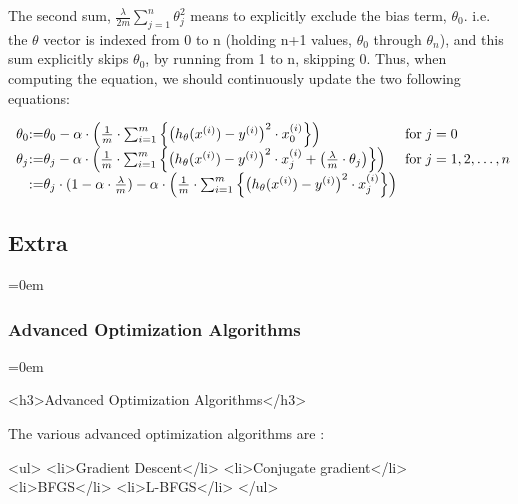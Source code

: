The second sum, 
\( \frac{\lambda}{2m}
   \sum_{j = 1}^{n} {\theta_{j}^{2}} \)
means to explicitly exclude the bias term, $\theta_0$. i.e. the $\theta$
vector is indexed from 0 to n (holding n+1 values, $\theta_0$ through
$\theta_n$), and this sum explicitly skips $\theta_0$, by
running from 1 to n, skipping 0. Thus, when computing the equation, we should
continuously update the two following equations:

	\[
	\begin{array}{ l@{} l@{} l@{} l@{} } 
		\theta_0
		& := &
		\theta_0
		- \alpha
		\cdot
		\left(
		\frac{1}{m}
		\cdot 
			\sum_{i=1}^m
			\left\{
				\left(
					h_\theta(x^{(i)}) - y^{(i)}
				\right)^{2}
				\cdot
				x_{0}^{(i)}
			\right\}
		\right) 
		\hspace{0.5cm} & \text{for} \; j = 0 
		\\ 
		\theta_j
		& := &
		\theta_j
		- \alpha
		\cdot
		\left(
		\frac{1}{m}
		\cdot 
			\sum_{i=1}^m
			\left\{
				\left(
					h_\theta(x^{(i)}) - y^{(i)}
				\right)^{2}
				\cdot
				x_{j}^{(i)}
				+
				\left(
					\frac{\lambda}{m}\cdot \theta_j
				\right)
			\right\}
		\right) 
		\hspace{0.5cm} & \text{for} \; j = 1,2, \ldots , n 
		\\ 
		& :=
		& \theta_j
		\cdot
		(1 - \alpha \cdot \frac{\lambda}{m})
		-
		\alpha
		\cdot
		\left(
		\frac{1}{m}
		\cdot 
			\sum_{i=1}^m
			\left\{
				\left(
					h_\theta(x^{(i)}) - y^{(i)}
				\right)^{2}
				\cdot
				x_{j}^{(i)} 
			\right\}
		\right) 
		\\ 
		\end{array}
	\]
\subsectionend
\subsection{Extra}
\label{ssec:extra}
\parindent=0em

\subsubsection{Advanced Optimization Algorithms}
\label{sssec:advanced_optimization_algorithms}
\parindent=0em


	<h3>Advanced Optimization Algorithms</h3>

	The various advanced optimization algorithms are :


	<ul>
		<li>Gradient Descent</li>
		<li>Conjugate gradient</li>
		<li>BFGS</li>
		<li>L-BFGS</li>
	</ul>

